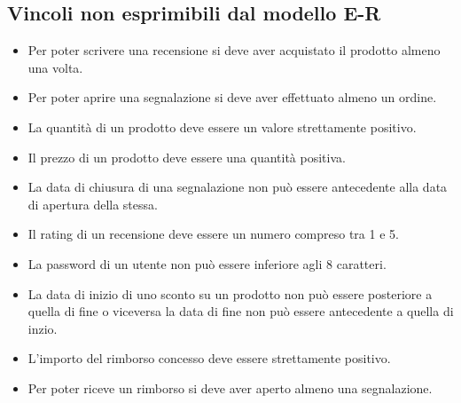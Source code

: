 \subsection{Vincoli non esprimibili dal modello E-R}

\begin{itemize}
    \item Per poter scrivere una recensione si deve aver acquistato il prodotto almeno una volta. 
    \item Per poter aprire una segnalazione si deve aver effettuato almeno un ordine.
    \item La quantità di un prodotto deve essere un valore strettamente positivo.
    \item Il prezzo di un prodotto deve essere una quantità positiva.
    \item La data di chiusura di una segnalazione non può essere antecedente alla data di apertura della stessa.
    \item Il rating di un recensione deve essere un numero compreso tra 1 e 5.
    \item La password di un utente non può essere inferiore agli 8 caratteri.
    \item La data di inizio di uno sconto su un prodotto non può essere posteriore a quella di fine o viceversa la data di fine non può essere antecedente a quella di inzio.
    \item L'importo del rimborso concesso deve essere strettamente positivo.
    \item Per poter riceve un rimborso si deve aver aperto almeno una segnalazione.
\end{itemize}